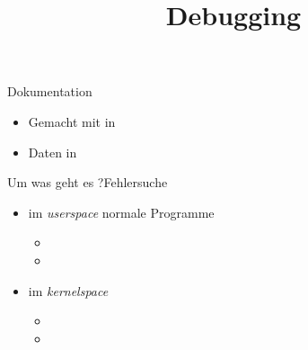 \documentclass{beamer}
\begin{document}
\title{Debugging}

\frame{\titlepage}

\begin{frame}{Dokumentation}
\begin{itemize}
 \item Gemacht mit  in 
 \item Daten in 
\end{itemize}
\end{frame}

\begin{frame}{Um was geht es ?}{Fehlersuche}

 \begin{itemize}
  \item im {\em userspace} normale Programme
   \begin{itemize}
    \item \host
    \item \target
   \end{itemize}
  \item im {\em kernelspace} 
   \begin{itemize}
    \item \host
    \item \target
   \end{itemize}
 \end{itemize}
\end{frame}




\end{document}

